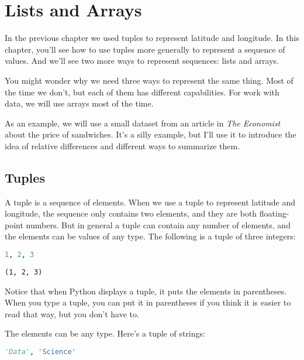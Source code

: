 \hypertarget{lists-and-arrays}{%
\chapter{Lists and Arrays}\label{lists-and-arrays}}

In the previous chapter we used tuples to represent latitude and
longitude. In this chapter, you'll see how to use tuples more generally
to represent a sequence of values. And we'll see two more ways to
represent sequences: lists and arrays.

You might wonder why we need three ways to represent the same thing.
Most of the time we don't, but each of them has different capabilities.
For work with data, we will use arrays most of the time.

As an example, we will use a small dataset from an article in \emph{The
Economist} about the price of sandwiches. It's a silly example, but I'll
use it to introduce the idea of relative differences and different ways
to summarize them.

\hypertarget{tuples}{%
\section{Tuples}\label{tuples}}

A tuple is a sequence of elements. When we use a tuple to represent
latitude and longitude, the sequence only contains two elements, and
they are both floating-point numbers. But in general a tuple can contain
any number of elements, and the elements can be values of any type. The
following is a tuple of three integers:

\begin{lstlisting}[language=Python,style=source]
1, 2, 3
\end{lstlisting}

\begin{lstlisting}[style=output]
(1, 2, 3)
\end{lstlisting}

Notice that when Python displays a tuple, it puts the elements in
parentheses. When you type a tuple, you can put it in parentheses if you
think it is easier to read that way, but you don't have to.

The elements can be any type. Here's a tuple of strings:

\begin{lstlisting}[language=Python,style=source]
'Data', 'Science'
\end{lstlisting}


